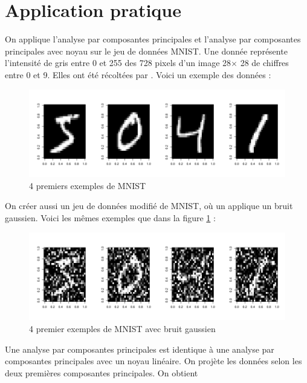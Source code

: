 \section{Application pratique}

On applique l'analyse par composantes principales et l'analyse par composantes principales avec noyau sur le jeu de données MNIST. Une donnée représente l'intensité de gris entre 0 et 255 des 728 pixels d'un image 28$\times$ 28 de chiffres entre 0 et 9. Elles ont été récoltées par \cite{lecun1998gradient}. Voici un exemple des données : 

\begin{figure}[H]
	\includegraphics[width=\textwidth]{digits-original}
	\caption{4 premiers exemples de MNIST}
	\label{fig:mnist-original}
\end{figure}

On créer aussi un jeu de données modifié de MNIST, où un applique un bruit gaussien. Voici les mêmes exemples que dans la figure \ref{fig:mnist-original} :

\begin{figure}[H]
	\includegraphics[width=\textwidth]{digits-noisy}
	\caption{4 premier exemples de MNIST avec bruit gaussien}
\end{figure}

Une analyse par composantes principales est identique à une analyse par composantes principales avec un noyau linéaire. On projète les données selon les deux premières composantes principales. On obtient

